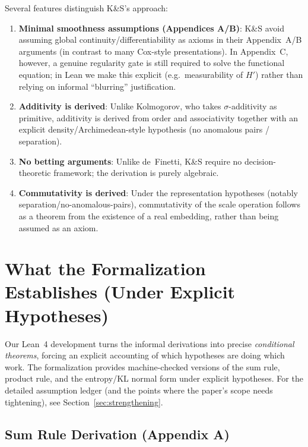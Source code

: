 \documentclass[11pt]{article}
\begin{document}
Several features distinguish K\&S's approach:

\begin{enumerate}
\item \textbf{Minimal smoothness assumptions (Appendices A/B)}: K\&S avoid assuming global
continuity/differentiability as axioms in their Appendix~A/B arguments (in contrast to many Cox-style
presentations). In Appendix~C, however, a genuine regularity gate is still required to solve the
functional equation; in Lean we make this explicit (e.g.\ measurability of $H'$) rather than relying on
informal ``blurring'' justification.

\item \textbf{Additivity is derived}: Unlike Kolmogorov, who takes $\sigma$-additivity as
primitive, additivity is derived from order and associativity together with
an explicit density/Archimedean-style hypothesis (no anomalous pairs / separation).

\item \textbf{No betting arguments}: Unlike de~Finetti, K\&S require no decision-theoretic
framework; the derivation is purely algebraic.

\item \textbf{Commutativity is derived}: Under the representation hypotheses (notably separation/no-anomalous-pairs),
commutativity of the scale operation follows as a theorem from the existence of a real embedding, rather than
being assumed as an axiom.
\end{enumerate}

\section{What the Formalization Establishes (Under Explicit Hypotheses)}

Our Lean~4 development turns the informal derivations into precise \emph{conditional theorems},
forcing an explicit accounting of which hypotheses are doing which work.
The formalization provides machine-checked versions of the sum rule, product rule, and the
entropy/KL normal form under explicit hypotheses.
For the detailed assumption ledger (and the points where the paper's scope needs tightening),
see Section~\ref{sec:strengthening}.

\subsection{Sum Rule Derivation (Appendix A)}
\end{document}
